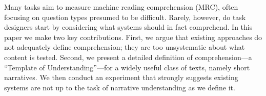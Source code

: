 Many tasks aim to measure machine reading comprehension (MRC), often focusing on question types presumed to be difficult. Rarely, however, do task designers start by considering what systems should in fact comprehend. In this paper we make two key contributions. First, we argue that existing approaches do not adequately define comprehension; they are too unsystematic about what content is tested. Second, we present a detailed definition of comprehension—a ``Template of Understanding''—for a widely useful class of texts, namely short narratives. We then conduct an experiment that strongly suggests existing systems are not up to the task of narrative understanding as we define it.
